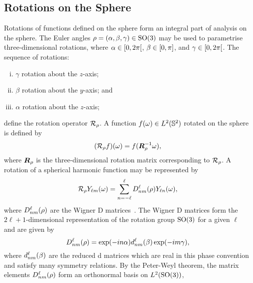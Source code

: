 

\subsection{Rotations on the Sphere}

Rotations of functions defined on the sphere form an integral part of analysis on the sphere.
The Euler angles \(\rho=(\alpha,\beta,\gamma) \in \text{SO(3)}{}\) may be used to parametrise three-dimensional rotations, where \(\alpha \in \interval[open right]{0}{2\pi}\), \(\beta \in \interval{0}{\pi}\), and \(\gamma \in \interval[open right]{0}{2\pi}\).
The sequence of rotations:
%
\begin{enumerate}[(i),nosep,left=\parindent]
	\item \({\gamma}\) rotation about the \(z\)-axis;
	\item \({\beta}\) rotation about the \(y\)-axis; and
	\item \({\alpha}\) rotation about the \(z\)-axis;
\end{enumerate}
%
define the rotation operator \(\mathcal{R}_{\rho}\).
A function \(f(\omega) \in L^{2}(\mathbb{S}^{2})\) rotated on the sphere is defined by
%
\begin{equation}
	(\mathcal{R}_{\rho}f)(\omega)
	= f(\vb*{R}_{\rho}^{-1} \omega),
\end{equation}
%
where \(\vb*{R}_{\rho}{}\) is the three-dimensional rotation matrix corresponding to \(\mathcal{R}_{\rho}\).
A rotation of a spherical harmonic function may be represented by
%
\begin{equation}\label{eq:chapter2_rotate_spherical_harmonics}
	\mathcal{R}_{\rho} {Y}_{\ell m}(\omega)
	= \displaystyle\sum\limits_{n=-\ell}^{\ell} D^{\ell}_{nm}(\rho) Y_{\ell n}(\omega),
\end{equation}
%
where \(D^{\ell}_{nm}(\rho)\) are the Wigner D matrices~\cite{Brink1993,Ritchie1999}.
The Wigner D matrices form the \(2\ell+1\)-dimensional representation of the rotation group \(\text{SO(3)}{}\) for a given \(\ell{}\) and are given by
%
\begin{equation}
	D^{\ell}_{nm}(\rho)
	= \exp(-i n\alpha) d^{\ell}_{nm}(\beta) \exp(-i m\gamma),
\end{equation}
%
where \(d^{\ell}_{nm}(\beta)\) are the reduced d matrices which are real in this phase convention and satisfy many symmetry relations.
By the Peter-Weyl theorem, the matrix elements \(D^{\ell}_{nm}(\rho)\) form an orthonormal basis on \(L^{2}(\text{SO(3)})\), \ie{}
